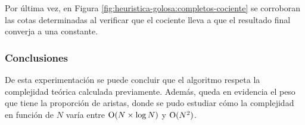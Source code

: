 Por última vez, en Figura \ref{fig:heuristica-golosa:completos-cociente} se corroboran
las cotas determinadas al verificar que el cociente lleva a que el resultado
final converja a una constante.

\subsubsection{Conclusiones}

De esta experimentación se puede concluir que el algoritmo respeta la
complejidad teórica calculada previamente. Además, queda en evidencia el peso que tiene la
proporción de aristas, donde se pudo estudiar cómo la complejidad en función de
$N$ varía entre $\operatorname{O}(N \times \log N)$ y $\operatorname{O}(N^2)$.
